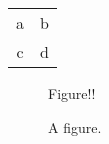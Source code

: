 \documentclass{article}
\begin{document}
\begin{minipage}{\linewidth}
\begin{tabular}{c c}
 a & b \\
 c & d
\end{tabular}
\end{minipage}

\begin{figure}
    Figure!!

    \caption{A figure.}
\end{figure}
\end{document}
